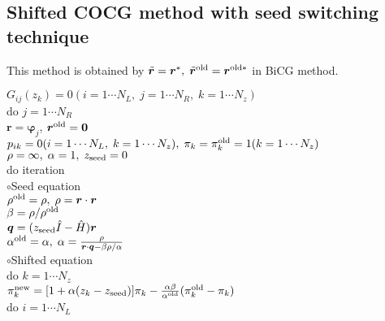 \documentclass[12pt,titlepage]{article}
\begin{document}
\subsection{Shifted COCG method with seed switching technique}

This method is obtained by 
${\tilde {\boldsymbol r}} = {\boldsymbol r}^*,\; 
{\tilde {\boldsymbol r}}^{\rm old} = {\boldsymbol r}^{{\rm old}*}$
in BiCG method.

\noindent
$G_{i j}(z_k) = 0 (i=1 \cdots N_L,\; j = 1 \cdots N_R,\; k=1 \cdots N_z)$
\\
do $j = 1 \cdots N_R$
\\\hspace{0.5cm}
${\boldsymbol r} = {\boldsymbol \varphi_j}$, 
${\boldsymbol r}^{\rm old} = {\bf 0}$
\\\hspace{0.5cm}
$p_{i k} = 0(i=1 \cdots N_L,\; k=1 \cdots N_z),\; \pi_k=\pi_k^{\rm old} = 1(k=1 \cdots N_z)$ 
\\\hspace{0.5cm}
$\rho = \infty,\; \alpha = 1,\; z_{\rm seed}=0$ 
\\\hspace{0.5cm}
do iteration
\\\hspace{1.0cm}
$\circ$Seed equation
\\\hspace{1.0cm}
$\rho^{\rm old} = \rho,\; \rho = {\boldsymbol r} \cdot {\boldsymbol r}$
\\\hspace{1.0cm}
$\beta = \rho / \rho^{\rm old}$
\\\hspace{1.0cm}
${\boldsymbol q} = (z_{\rm seed} {\hat I} - {\hat H}){\boldsymbol r}$
\\\hspace{1.0cm}
$\alpha^{\rm old} = \alpha,\; 
\alpha = \frac{\rho}{{\boldsymbol r}\cdot{\boldsymbol q} - \beta \rho / \alpha }$
\\\hspace{1.0cm}
$\circ$Shifted equation
\\\hspace{1.0cm}
do $k = 1 \cdots N_z$
\\\hspace{1.5cm}
$\pi_k^{\rm new} = [1+\alpha(z_k-z_{\rm seed})]\pi_k - \frac{\alpha \beta}{\alpha^{\rm old}}(\pi_k^{\rm old} - \pi_k)$
\\\hspace{1.5cm}
do $i = 1 \cdots N_L$
\end{document}
